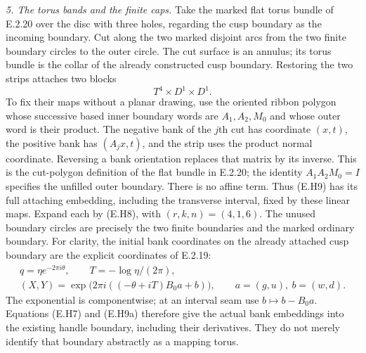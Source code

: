 \emph{5. The torus bands and the finite caps.}
Take the marked flat torus bundle of E.2.20 over the disc with
three holes, regarding the cusp boundary as the incoming boundary.
Cut along the two marked disjoint arcs from the two finite boundary
circles to the outer circle.  The cut surface is an annulus;
its torus bundle is the collar of the already constructed cusp
boundary.  Restoring the two strips attaches two blocks
\[
                 T^4\times D^1\times D^1.
 \tag{E.H9}
\]
To fix their maps without a planar drawing, use the oriented ribbon
polygon whose successive based inner boundary words are
$A_1,A_2,M_0$ and whose outer word is their product.  The negative
bank of the $j$th cut has coordinate $(x,t)$, the positive bank
has $(A_jx,t)$, and the strip uses the product normal coordinate.
Reversing a bank orientation replaces that matrix by its inverse.
This is the cut-polygon definition of the flat bundle in E.2.20;
the identity $A_1A_2M_0=I$ specifies the unfilled outer boundary.
There is no affine term.  Thus (E.H9) has its full attaching
embedding, including the transverse interval, fixed by these
linear maps.  Expand each by (E.H8), with $(r,k,n)=(4,1,6)$.
The unused boundary circles are precisely the two finite boundaries
and the marked ordinary boundary.
For clarity, the initial bank coordinates on the already attached
cusp boundary are the explicit coordinates of E.2.19:
\[
 \begin{gathered}
 q=\eta e^{-2\pi i\theta},\qquad T=-\log\eta/(2\pi),\\
 (X,Y)=\exp\bigl(2\pi i((-\theta+iT)B_0a+b)\bigr),
 \qquad a=(g,u),\ b=(w,d).
 \end{gathered}
 \tag{E.H9a}
\]
The exponential is componentwise; at an interval seam use
$b\mapsto b-B_0a$.  Equations (E.H7) and (E.H9a) therefore
give the actual bank embeddings into the existing handle
boundary, including their derivatives.  They do not merely
identify that boundary abstractly as a mapping torus.

